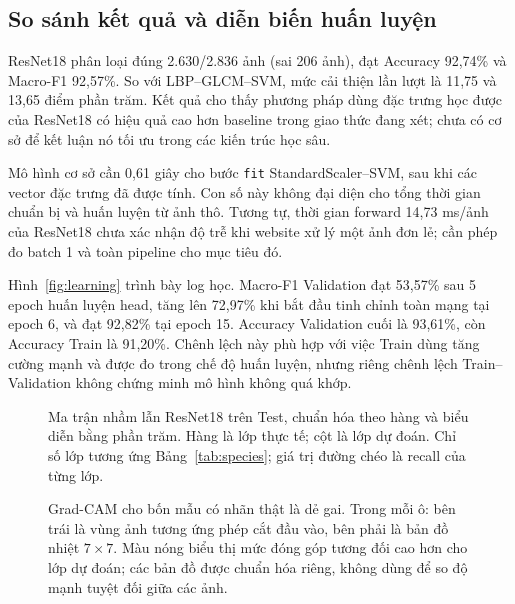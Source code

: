 \documentclass[conference]{IEEEtran}
\begin{document}
\subsection{So sánh kết quả và diễn biến huấn luyện}
ResNet18 phân loại đúng 2.630/2.836 ảnh (sai 206 ảnh), đạt Accuracy 92,74\% và Macro-F1 92,57\%. So với LBP--GLCM--SVM, mức cải thiện lần lượt là 11,75 và 13,65 điểm phần trăm. Kết quả cho thấy phương pháp dùng đặc trưng học được của ResNet18 có hiệu quả cao hơn baseline trong giao thức đang xét; chưa có cơ sở để kết luận nó tối ưu trong các kiến trúc học sâu.

Mô hình cơ sở cần 0,61 giây cho bước \texttt{fit} StandardScaler--SVM, sau khi các vector đặc trưng đã được tính. Con số này không đại diện cho tổng thời gian chuẩn bị và huấn luyện từ ảnh thô. Tương tự, thời gian forward 14,73 ms/ảnh của ResNet18 chưa xác nhận độ trễ khi website xử lý một ảnh đơn lẻ; cần phép đo batch 1 và toàn pipeline cho mục tiêu đó.

Hình~\ref{fig:learning} trình bày log học. Macro-F1 Validation đạt 53,57\% sau 5 epoch huấn luyện head, tăng lên 72,97\% khi bắt đầu tinh chỉnh toàn mạng tại epoch 6, và đạt 92,82\% tại epoch 15. Accuracy Validation cuối là 93,61\%, còn Accuracy Train là 91,20\%. Chênh lệch này phù hợp với việc Train dùng tăng cường mạnh và được đo trong chế độ huấn luyện, nhưng riêng chênh lệch Train--Validation không chứng minh mô hình không quá khớp.

\begin{figure}[!p]
\centering
\resizebox{\textwidth}{!}{}
\caption{Loss và Macro-F1 qua 15 epoch. Các đường được vẽ từ log của lần chạy; đường dọc nét đứt đánh dấu thời điểm chuyển từ huấn luyện head sang tinh chỉnh toàn mạng.}
\label{fig:learning}
\par\medskip
\resizebox{\textwidth}{!}{}
\caption{Ma trận nhầm lẫn ResNet18 trên Test, chuẩn hóa theo hàng và biểu diễn bằng phần trăm. Hàng là lớp thực tế; cột là lớp dự đoán. Chỉ số lớp tương ứng Bảng~\ref{tab:species}; giá trị đường chéo là recall của từng lớp.}
\label{fig:cm}
\end{figure}

\begin{figure}[!t]
\centering

\caption{Grad-CAM cho bốn mẫu có nhãn thật là dẻ gai. Trong mỗi ô: bên trái là vùng ảnh tương ứng phép cắt đầu vào, bên phải là bản đồ nhiệt $7\times7$. Màu nóng biểu thị mức đóng góp tương đối cao hơn cho lớp dự đoán; các bản đồ được chuẩn hóa riêng, không dùng để so độ mạnh tuyệt đối giữa các ảnh.}
\label{fig:cam}
\end{figure}
\end{document}

